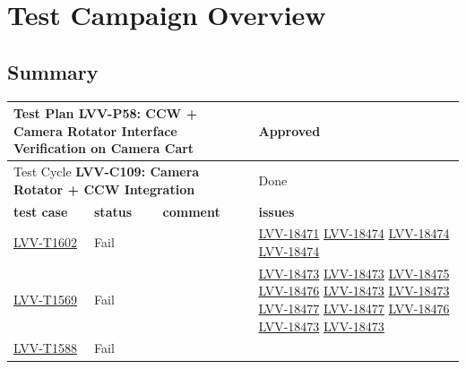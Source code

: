 \documentclass[SE,lsstdraft,STR,toc]{lsstdoc}
\begin{document}
\newpage

\section{Test Campaign Overview}
\label{sect:overview}

\subsection{Summary}
\label{sect:summarytable}

\begin{longtable}{p{2cm}p{2.5cm}p{9cm}p{2.5cm}}
\toprule
\multicolumn{3}{l}{ Test Plan {\bf LVV-P58: CCW + Camera Rotator Interface Verification on Camera Cart
 }} & Approved \\\hline

  \multicolumn{3}{l}{ Test Cycle {\bf LVV-C109: Camera Rotator + CCW Integration
 }} & Done \\\hline

  {\bf \footnotesize test case} & {\bf \footnotesize status} & {\bf \footnotesize comment} & {\bf \footnotesize issues} \\\toprule

    \href{https://jira.lsstcorp.org/secure/Tests.jspa#/testCase/LVV-T1602}{LVV-T1602}
    & Fail &
    \begin{minipage}[]{9cm}
    \smallskip
    
    \medskip
    \end{minipage}
    &
          \href{https://jira.lsstcorp.org/browse/LVV-18471}{LVV-18471}
          \href{https://jira.lsstcorp.org/browse/LVV-18474}{LVV-18474}
          \href{https://jira.lsstcorp.org/browse/LVV-18474}{LVV-18474}
          \href{https://jira.lsstcorp.org/browse/LVV-18474}{LVV-18474}
    \\\hline
    \href{https://jira.lsstcorp.org/secure/Tests.jspa#/testCase/LVV-T1569}{LVV-T1569}
    & Fail &
    \begin{minipage}[]{9cm}
    \smallskip
    
    \medskip
    \end{minipage}
    &
          \href{https://jira.lsstcorp.org/browse/LVV-18473}{LVV-18473}
          \href{https://jira.lsstcorp.org/browse/LVV-18473}{LVV-18473}
          \href{https://jira.lsstcorp.org/browse/LVV-18475}{LVV-18475}
          \href{https://jira.lsstcorp.org/browse/LVV-18476}{LVV-18476}
          \href{https://jira.lsstcorp.org/browse/LVV-18473}{LVV-18473}
          \href{https://jira.lsstcorp.org/browse/LVV-18473}{LVV-18473}
          \href{https://jira.lsstcorp.org/browse/LVV-18477}{LVV-18477}
          \href{https://jira.lsstcorp.org/browse/LVV-18477}{LVV-18477}
          \href{https://jira.lsstcorp.org/browse/LVV-18476}{LVV-18476}
          \href{https://jira.lsstcorp.org/browse/LVV-18473}{LVV-18473}
          \href{https://jira.lsstcorp.org/browse/LVV-18473}{LVV-18473}
    \\\hline
    \href{https://jira.lsstcorp.org/secure/Tests.jspa#/testCase/LVV-T1588}{LVV-T1588}
    & Fail &
    \begin{minipage}[]{9cm}
    \smallskip
    

\end{minipage}
\end{longtable}
\end{document}
